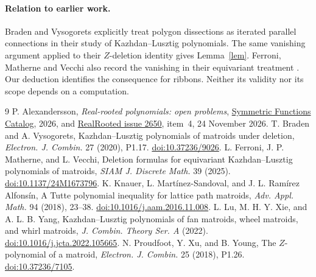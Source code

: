 \documentclass[11pt]{article}
\begin{document}
\paragraph{Relation to earlier work.}
Braden and Vysogorets explicitly treat polygon dissections as iterated
parallel connections in their study of Kazhdan--Lusztig polynomials. The
same vanishing argument applied to their $Z$-deletion identity gives
Lemma~\ref{lem}. Ferroni, Matherne and Vecchi also record the vanishing
in their equivariant treatment \cite[Theorem~1.1 and \S4.1.2]{fmv}.
Our deduction identifies the consequence for ribbons. Neither its
validity nor its scope depends on a computation.

\small
\begin{thebibliography}{9}
\setlength{\itemsep}{2pt}
 P. Alexandersson, \emph{Real-rooted polynomials: open problems},
\href{https://www.symmetricfunctions.com/realRootedOpenProblems.htm\#openProblemsGraphs}{Symmetric Functions Catalog}, 2026, and \href{https://github.com/PerAlexandersson/RealRooted/issues/2650}{RealRooted issue 2650}, item~4, 24 November 2026.
 T. Braden and A. Vysogorets, Kazhdan--Lusztig polynomials of matroids under deletion, \emph{Electron. J. Combin.} 27 (2020), P1.17. \href{https://doi.org/10.37236/9026}{doi:10.37236/9026}.
 L. Ferroni, J. P. Matherne, and L. Vecchi, Deletion formulas for equivariant Kazhdan--Lusztig polynomials of matroids, \emph{SIAM J. Discrete Math.} 39 (2025). \href{https://doi.org/10.1137/24M1673796}{doi:10.1137/24M1673796}.
 K. Knauer, L. Mart\'inez-Sandoval, and J. L. Ram\'irez Alfons\'in, A Tutte polynomial inequality for lattice path matroids, \emph{Adv. Appl. Math.} 94 (2018), 23--38. \href{https://doi.org/10.1016/j.aam.2016.11.008}{doi:10.1016/j.aam.2016.11.008}.
 L. Lu, M. H. Y. Xie, and A. L. B. Yang, Kazhdan--Lusztig polynomials of fan matroids, wheel matroids, and whirl matroids, \emph{J. Combin. Theory Ser. A} (2022). \href{https://doi.org/10.1016/j.jcta.2022.105665}{doi:10.1016/j.jcta.2022.105665}.
 N. Proudfoot, Y. Xu, and B. Young, The $Z$-polynomial of a matroid, \emph{Electron. J. Combin.} 25 (2018), P1.26. \href{https://doi.org/10.37236/7105}{doi:10.37236/7105}.
\end{thebibliography}
\end{document}
